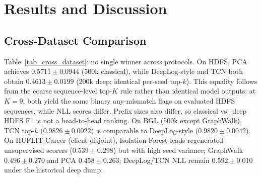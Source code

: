 \documentclass[runningheads]{llncs}
\begin{document}
\section{Results and Discussion}
\subsection{Cross-Dataset Comparison}
Table~\ref{tab_cross_dataset}: no single winner across protocols. On HDFS, PCA achieves $0.5711\pm0.0944$ (500k classical), while DeepLog-style and TCN both obtain $0.4613\pm0.0199$ (200k deep; identical per-seed top-$k$). This equality follows from the coarse sequence-level top-$K$ rule rather than identical model outputs: at $K{=}9$, both yield the same binary any-mismatch flags on evaluated HDFS sequences, while NLL scores differ. Prefix sizes also differ, so classical vs.\ deep HDFS F1 is not a head-to-head ranking. On BGL (500k except GraphWalk), TCN top-$k$ ($0.9826\pm0.0022$) is comparable to DeepLog-style ($0.9820\pm0.0042$). On HUFLIT-Career (client-disjoint), Isolation Forest leads regenerated unsupervised scorers ($0.539\pm0.298$) but with high seed variance; GraphWalk $0.496\pm0.270$ and PCA $0.458\pm0.263$; DeepLog/TCN NLL remain $0.592\pm0.010$ under the historical deep dump.
\end{document}
